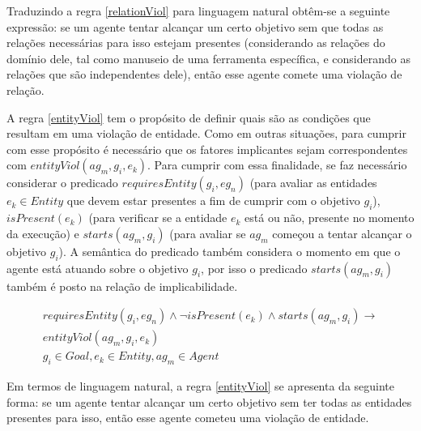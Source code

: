Traduzindo a regra \ref{relationViol} para linguagem natural obtêm-se a seguinte expressão: se um agente tentar alcançar um certo objetivo sem que todas as relações necessárias para isso estejam presentes (considerando as relações do domínio dele, tal como manuseio de uma ferramenta específica, e considerando as relações que são independentes dele), então esse agente comete uma violação de relação. 

A regra \ref{entityViol} tem o propósito de definir quais são as condições que resultam em uma violação de entidade. Como em outras situações, para cumprir com esse propósito é necessário que os fatores implicantes sejam correspondentes com $entityViol(ag_m,g_i,e_k)$. Para cumprir com essa finalidade, se faz necessário considerar o predicado $requiresEntity(g_i,eg_n)$ (para avaliar as entidades $e_k \in Entity$ que devem estar presentes a fim de cumprir com o objetivo $g_i$), $isPresent(e_k)$ (para verificar se a entidade $e_k$ está ou não, presente no momento da execução) e $starts(ag_m,g_i)$ (para avaliar se $ag_m$ começou a tentar alcançar o objetivo $g_i$). A semântica do predicado também considera o momento em que o agente está atuando sobre o objetivo $g_i$, por isso o predicado $starts(ag_m,g_i)$ também é posto na relação de implicabilidade.

\begin{eqnarray}\label{entityViol}\nonumber
	requiresEntity(g_i,eg_n) \wedge \neg isPresent(e_k) \wedge starts(ag_m,g_i) \to \nonumber \\ 
    entityViol(ag_m,g_i,e_k)  \nonumber \\  
    g_i \in Goal, e_k \in Entity, ag_m \in Agent
\end{eqnarray}

Em termos de linguagem natural, a regra \ref{entityViol} se apresenta da seguinte forma: se um agente tentar alcançar um certo objetivo sem ter todas as entidades presentes para isso, então esse agente cometeu uma violação de entidade.

